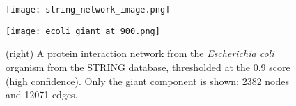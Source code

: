\begin{savenotes}
    \begin{figure}
        \begin{minipage}{.48\textwidth}
            \centering
            \texttt{[image: string\_network\_image.png]}
            \caption[Protein-protein interaction network visualised by the STRING database~\cite{Szklarczyk2019}.
            Edge thickness indicates the overall confidence score, i.e. the strength of data support.]%
            {Protein-protein interaction network visualised\protect\footnotemark{} by the STRING database~\cite{Szklarczyk2019}.
            Edge thickness indicates the overall confidence score, i.e. the strength of data support.}
            \label{fig:string_network_image}
        \end{minipage}\hfill%
        \begin{minipage}{.48\textwidth}
            \centering
            \vspace*{-6mm}
            \texttt{[image: ecoli\_giant\_at\_900.png]}
        \end{minipage}
        \caption{(right) A protein interaction network from the \textit{Escherichia coli} organism from the STRING database, thresholded at the $0.9$ score (high confidence). Only the giant component is shown: 2382 nodes and 12071 edges.}
        \label{fig:ecoli_giant_at_900}
    \end{figure}
\end{savenotes}
